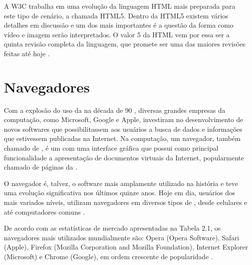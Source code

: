 \documentclass[espaco=simples,appendix=Name]{abnt}
\begin{document}
A W3C trabalha em uma evolução da linguagem HTML mais preparada para este tipo de cenário, a chamada HTML5. Dentro da HTML5 existem vários detalhes em discussão e um dos mais importantes é a questão da forma como vídeo e imagem serão interpretados. O valor 5 da HTML vem por essa ser a quinta revisão completa da linguagem, que promete ser uma das maiores revisões feitas até hoje \cite{HTML5spec}.


\section{Navegadores}

Com a explosão do uso da  na década de 90 \cite{BloombergGameChangers}, diversas grandes empresas da computação, como Microsoft, Google e Apple, investiram no desenvolvimento de novos softwares que possibilitassem aos usuários a busca de dados e informações que estivessem publicadas na Internet. Na computação, um navegador, também chamado de , é um  com uma interface gráfica que possui como principal funcionalidade a apresentação de documentos virtuais da Internet, popularmente chamado de páginas da .

O navegador é, talvez, o software mais amplamente utilizado na história e teve uma evolução significativa nos últimos quinze anos. Hoje em dia, usuários dos mais variados níveis, utilizam navegadores em diversos tipos de , desde celulares e  até computadores comuns \cite{ArchitectureWebBrowsers}.

De acordo com as estatísticas de mercado apresentadas na Tabela 2.1, os navegadores mais utilizados mundialmente são: Opera (Opera Software), Safari (Apple), Firefox (Mozilla Corporation and Mozilla Foundation), Internet Explorer (Microsoft) e Chrome (Google), em ordem crescente de popularidade \cite{BrowserStats}.
\end{document}
